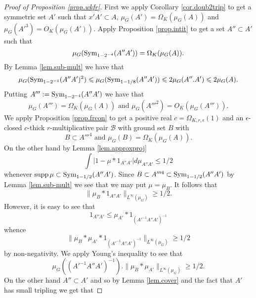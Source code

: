 \documentclass[12pt]{amsart}
\numberwithin{equation}{section}
\theoremstyle{plain}
\theoremstyle{definition}
\renewcommand{\leq}{\leqslant}
\renewcommand{\geq}{\geqslant}
\providecommand{\supp}{\mathop{\rm supp}\nolimits}
\providecommand{\Sym}{\mathop{\rm Sym}\nolimits}
\begin{document}
\begin{proof}[Proof of Proposition \ref{prop.wkfr}]
First we apply Corollary \ref{cor.doub2trip} to get a symmetric set $A'$ such that $x'A' \subset A$, $\mu_G(A') = \Omega_K(\mu_G(A))$ and $\mu_G(A'^3)=O_K(\mu_G(A'))$. Apply Proposition \ref{prop.intit} to get a set $A'' \subset A'$ such that
\begin{equation*}
\mu_G(\Sym_{1-2^{-4}}(A''A')) =\Omega_K(\mu_G(A)).
\end{equation*}
By Lemma \ref{lem.sub-mult} we have that
\begin{equation*}
\mu_G(\Sym_{1-2^{-4}}(A''A')^2) \leq \mu_G(\Sym_{1-1/8}(A''A')) \leq 2\mu_G(A''.A') \leq 2\mu_G(A).
\end{equation*}
Putting $A''':=\Sym_{1-2^{-4}}(A''A')$ we have that
\begin{equation*}
\mu_G(A''') = \Omega_K(\mu_G(A)) \textrm{ and } \mu_G(A'''^2) = O_K(\mu_G(A''')).
\end{equation*}
We apply Proposition \ref{prop.frcon} to get a positive real $c=\Omega_{K,r,\epsilon}(1)$ and an $\epsilon$-closed $c$-thick $r$-multiplicative pair $\mathcal{B}$ with ground set $B$ with
\begin{equation*}
B \subset A'''^4 \textrm{ and } \mu_G(B) = \Omega_K(\mu_G(A)).
\end{equation*}
On the other hand by Lemma \ref{lem.approxproj}
\begin{equation*}
\int{|1-\mu \ast 1_{A''A'}|d\mu_{A''A'}} \leq 1/2 
\end{equation*}
whenever $\supp \mu \subset \Sym_{1-1/2}(A''A')$.  Since $B \subset A'''^4 \subset \Sym_{1-1/2}(A''A')$ by Lemma \ref{lem.sub-mult} we see that we may put $\mu=\mu_{B}$.  It follows that
\begin{equation*}
\|\mu_B \ast 1_{A''A'}\|_{L^\infty(\mu_G)} \geq 1/2.
\end{equation*}
However, it is easy to see that
\begin{equation*}
1_{A''A'} \leq \mu_{A'} \ast 1_{(A'^{-1}A''A')^{-1}}
\end{equation*}
whence
\begin{equation*}
\|\mu_B \ast \mu_{A'} \ast 1_{(A'^{-1}A''A')^{-1}}\|_{L^\infty(\mu_G)} \geq 1/2
\end{equation*}
by non-negativity. We apply Young's inequality to see that
\begin{equation*}
\mu_G((A'^{-1}A''A')^{-1}).\|\mu_B \ast \mu_{A'}\|_{L^\infty(\mu_G)} \geq 1/2.
\end{equation*}
On the other hand $A'' \subset A'$ and so by Lemma \ref{lem.cover} and the fact that $A'$ has small tripling we get that

\end{proof}
\end{document}
